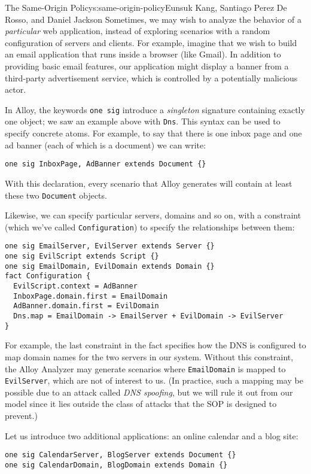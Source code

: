 \begin{aosachapter}{The Same-Origin Policy}{s:same-origin-policy}{Eunsuk Kang, Santiago Perez De Rosso, and Daniel Jackson}
Sometimes, we may wish to analyze the behavior of a \emph{particular}
web application, instead of exploring scenarios with a random
configuration of servers and clients. For example, imagine that we wish
to build an email application that runs inside a browser (like Gmail).
In addition to providing basic email features, our application might
display a banner from a third-party advertisement service, which is
controlled by a potentially malicious actor.

In Alloy, the keywords \texttt{one sig} introduce a \emph{singleton}
signature containing exactly one object; we saw an example above with
\texttt{Dns}. This syntax can be used to specify concrete atoms. For
example, to say that there is one inbox page and one ad banner (each of
which is a document) we can write:

\begin{verbatim}
one sig InboxPage, AdBanner extends Document {}
\end{verbatim}

With this declaration, every scenario that Alloy generates will contain
at least these two \texttt{Document} objects.

Likewise, we can specify particular servers, domains and so on, with a
constraint (which we've called \texttt{Configuration}) to specify the
relationships between them:

\begin{verbatim}
one sig EmailServer, EvilServer extends Server {}
one sig EvilScript extends Script {}
one sig EmailDomain, EvilDomain extends Domain {}
fact Configuration {
  EvilScript.context = AdBanner
  InboxPage.domain.first = EmailDomain
  AdBanner.domain.first = EvilDomain  
  Dns.map = EmailDomain -> EmailServer + EvilDomain -> EvilServer
}
\end{verbatim}

For example, the last constraint in the fact specifies how the DNS is
configured to map domain names for the two servers in our system.
Without this constraint, the Alloy Analyzer may generate scenarios where
\texttt{EmailDomain} is mapped to \texttt{EvilServer}, which are not of
interest to us. (In practice, such a mapping may be possible due to an
attack called \emph{DNS spoofing}, but we will rule it out from our
model since it lies outside the class of attacks that the SOP is
designed to prevent.)

Let us introduce two additional applications: an online calendar and a
blog site:

\begin{verbatim}
one sig CalendarServer, BlogServer extends Document {} 
one sig CalendarDomain, BlogDomain extends Domain {}
\end{verbatim}


\end{aosachapter}
